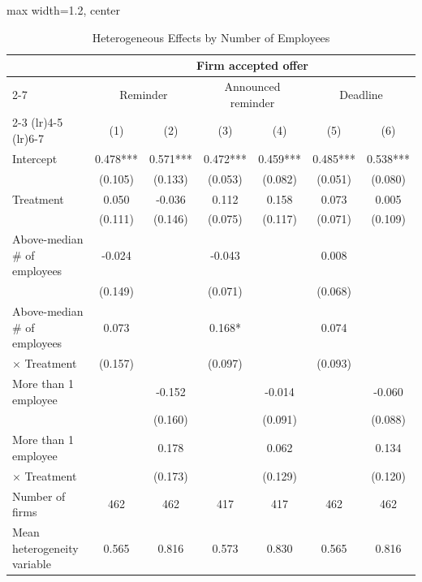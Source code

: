 \begin{table}[H] \centering
\caption{Heterogeneous Effects by Number of Employees}
\label{tab:het_num_employee_all_ontime}
\begin{adjustbox}{max width=1.2\textwidth, center}
\begin{tabular}{lcccccc}
\toprule
 & \multicolumn{6}{c}{Firm accepted offer} \\
\cmidrule(lr){2-7}
\multicolumn{1}{r}{Treatment:} & \multicolumn{2}{c}{Reminder} & \multicolumn{2}{c}{Announced reminder} & \multicolumn{2}{c}{Deadline} \\
\cmidrule(lr){2-3} \cmidrule(lr){4-5} \cmidrule(lr){6-7}
 & (1) & (2) & (3) & (4) & (5) & (6) \\
\midrule
Intercept & 0.478*** & 0.571*** & 0.472*** & 0.459*** & 0.485*** & 0.538*** \\ & (0.105) & (0.133) & (0.053) & (0.082) & (0.051) & (0.080) \\
Treatment & 0.050 & -0.036 & 0.112 & 0.158 & 0.073 & 0.005 \\ & (0.111) & (0.146) & (0.075) & (0.117) & (0.071) & (0.109) \\
Above-median \# of employees & -0.024 &  & -0.043 &  & 0.008 &  \\ & (0.149) &  & (0.071) &  & (0.068) \\
Above-median \# of employees & 0.073 &  & 0.168* &  & 0.074 &   \\
\hspace{1em} $\times$ Treatment & (0.157) &  & (0.097) &  & (0.093)  \\
More than 1 employee &  & -0.152 &  & -0.014 &  & -0.060 \\ &  & (0.160) &  & (0.091) &  & (0.088) \\
More than 1 employee &  & 0.178 &  & 0.062 &  & 0.134  \\
\hspace{1em} $\times$ Treatment &  & (0.173) &  & (0.129) &  & (0.120)  \\
\midrule
Number of firms & 462 & 462 & 417 & 417 & 462 & 462 \\
Mean heterogeneity variable & 0.565 & 0.816 & 0.573 & 0.830 & 0.565 & 0.816 \\
\bottomrule
\end{tabular}
\end{adjustbox}
\end{table}
